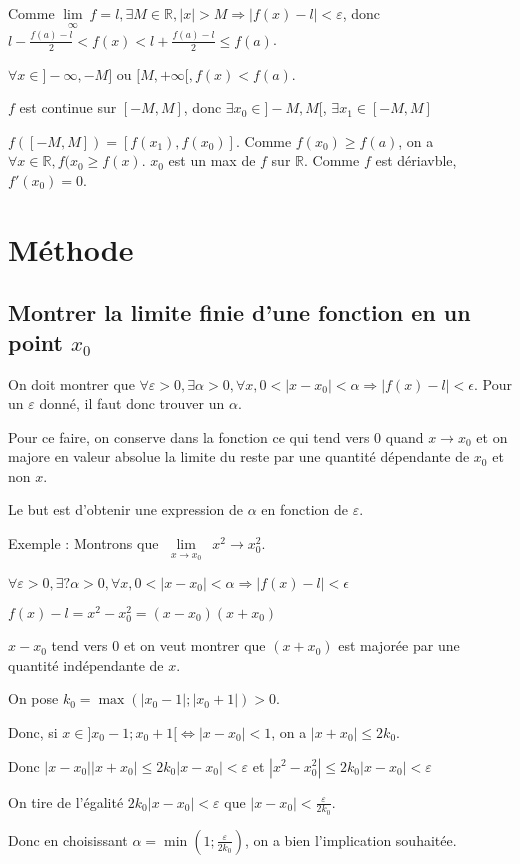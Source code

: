 \documentclass[french]{yLectureNote}
\newcommand{\Lim}[1]{\lim\limits_{\substack{#1}}\:}
\begin{document}
Comme $\Lim{\infty} f = l,\exists M\in\mathbb{R}, |x|>M \Rightarrow |f(x)-l| < \varepsilon$, donc $l-\frac{f(a)-l}{2} < f(x) < l+\frac{f(a)-l}{2} \leq f(a)$.

$\forall x\in ]-\infty,-M]$ ou $[M,+\infty[, f(x)<f(a)$.

$f$ est continue sur $[-M,M]$, donc $\exists x_0 \in ]-M,M[$, $\exists x_1 \in[-M,M]$

$f([-M,M]) = [f(x_1),f(x_0)]$. Comme $f(x_0) \geq f(a)$, on a $\forall x\in\mathbb{R},f(x_0\geq f(x)$. $x_0$ est un max de $f$ sur $\mathbb{R}$. Comme $f$ est dériavble, $f'(x_0) = 0$.
\section{Méthode}
\subsection{Montrer la limite finie d'une fonction en un point $x_0$}
On doit montrer que $\forall \varepsilon >0, \exists \alpha >0, \forall x, 0< |x-x_0|<\alpha \Rightarrow |f(x) - l|<\epsilon$. Pour un $\varepsilon$ donné, il faut donc trouver un $\alpha$.

Pour ce faire, on conserve dans la fonction ce qui tend vers 0 quand $x\rightarrow x_0$ et on majore en valeur absolue la limite du reste par une quantité dépendante de $x_0$ et non $x$.

Le but est d'obtenir une expression de $\alpha$ en fonction de $\varepsilon$.

Exemple : Montrons que $\Lim{x\rightarrow x_0} x^2 \rightarrow x_0^2$.

$\forall \varepsilon >0, \exists ? \alpha >0, \forall x, 0< |x-x_0|<\alpha \Rightarrow |f(x) - l|<\epsilon$

$f(x)-l = x^2-x_0^2 = (x-x_0)(x+x_0)$

$x-x_0$ tend vers 0 et on veut montrer que $(x+x_0)$ est majorée par une quantité indépendante de $x$.

On pose $k_0 = \max(|x_0-1|;|x_0+1|) > 0$.

Donc, si $x\in ]x_0-1;x_0+1[ \iff |x-x_0|<1$, on a $ |x+x_0| \leq 2k_0$.

Donc $|x-x_0||x+x_0| \leq 2k_0|x-x_0| <\varepsilon$ et $|x^2-x_0^2| \leq 2k_0|x-x_0| <\varepsilon$

On tire de l'égalité $2k_0|x-x_0| <\varepsilon$ que $|x-x_0| <\frac{\varepsilon}{2k_0}$.

Donc en choisissant $\alpha = \min(1; \frac{\varepsilon}{2k_0})$, on a bien l'implication souhaitée.
\end{document}
